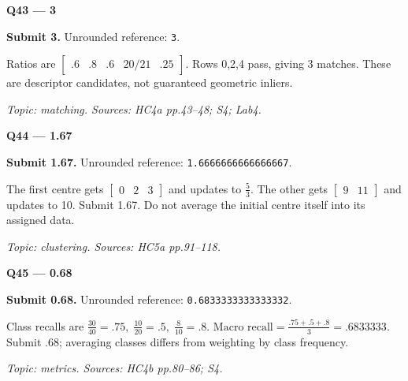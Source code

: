 \documentclass[11pt,a4paper]{article}
\begin{document}
\begin{minipage}{\linewidth}
\textbf{Q43 — 3}\par\smallskip
\textbf{Submit 3.} Unrounded reference: \texttt{3}.\par
Ratios are \(\begin{bmatrix}.6&.8&.6&20/21&.25\end{bmatrix}\). Rows 0,\allowbreak{}2,\allowbreak{}4 pass,\allowbreak{} giving 3 matches. These are descriptor candidates,\allowbreak{} not guaranteed geometric inliers.\par
{\small\itshape Topic: matching. Sources: HC4a pp.43–48; S4; Lab4.}

\end{minipage}
\par\vspace{12pt}
\begin{minipage}{\linewidth}
\textbf{Q44 — 1.67}\par\smallskip
\textbf{Submit 1.67.} Unrounded reference: \texttt{1.6666666666666667}.\par
The first centre gets \(\begin{bmatrix}0&2&3\end{bmatrix}\) and updates to \(\frac{5}{3}\). The other gets \(\begin{bmatrix}9&11\end{bmatrix}\) and updates to 10. Submit 1.67. Do not average the initial centre itself into its assigned data.\par
{\small\itshape Topic: clustering. Sources: HC5a pp.91–118.}

\end{minipage}
\par\vspace{12pt}
\begin{minipage}{\linewidth}
\textbf{Q45 — 0.68}\par\smallskip
\textbf{Submit 0.68.} Unrounded reference: \texttt{0.6833333333333332}.\par
Class recalls are \(\frac{30}{40}=.75,\;\frac{10}{20}=.5,\;\frac{8}{10}=.8\). \(\text{Macro recall}=\frac{.75+.5+.8}{3}=.6833333\). Submit .68; averaging classes differs from weighting by class frequency.\par
{\small\itshape Topic: metrics. Sources: HC4b pp.80–86; S4.}

\end{minipage}
\par\vspace{12pt}
\end{document}
